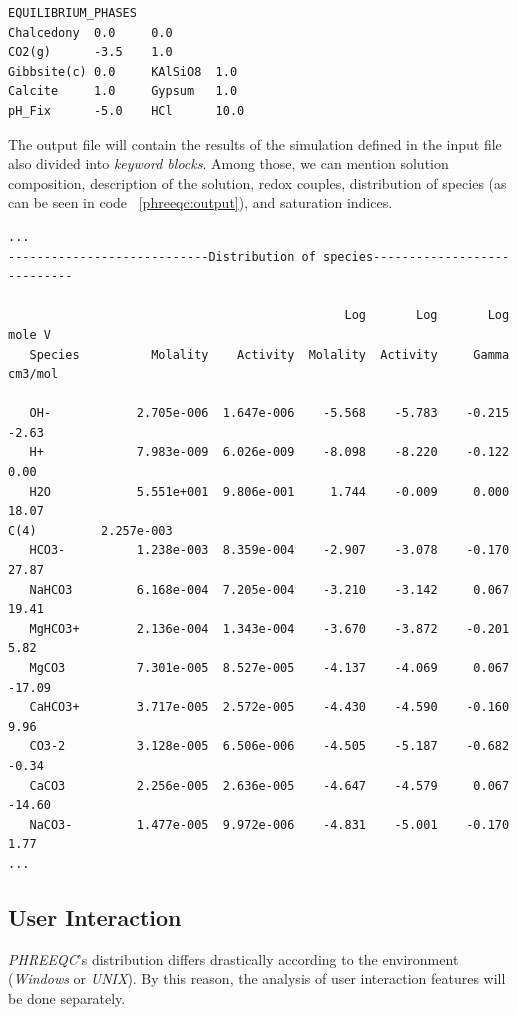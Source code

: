 \begin{minipage}[c]{0.92\textwidth}
\begin{lstlisting}[frame=single, caption=\emph{PHREEQC} keyword data block example, label=phreeqc:keyword]
EQUILIBRIUM_PHASES
Chalcedony  0.0     0.0
CO2(g)      -3.5    1.0
Gibbsite(c) 0.0     KAlSiO8  1.0
Calcite     1.0     Gypsum   1.0
pH_Fix      -5.0    HCl      10.0
\end{lstlisting}
\end{minipage}

The output file will contain the results of the simulation defined in the input file also divided into \emph{keyword blocks}. Among those, we can mention solution composition, description of the solution, redox couples, distribution of species (as can be seen in code ~\ref{phreeqc:output}), and saturation indices.

\begin{minipage}[c]{0.92\textwidth}
\begin{lstlisting}[frame=single, caption=\emph{PHREEQC}'s excerpt from the output file, label=phreeqc:output]
...
----------------------------Distribution of species----------------------------
 
                                               Log       Log       Log    mole V
   Species          Molality    Activity  Molality  Activity     Gamma   cm3/mol
 
   OH-            2.705e-006  1.647e-006    -5.568    -5.783    -0.215     -2.63
   H+             7.983e-009  6.026e-009    -8.098    -8.220    -0.122      0.00
   H2O            5.551e+001  9.806e-001     1.744    -0.009     0.000     18.07
C(4)         2.257e-003
   HCO3-          1.238e-003  8.359e-004    -2.907    -3.078    -0.170     27.87
   NaHCO3         6.168e-004  7.205e-004    -3.210    -3.142     0.067     19.41
   MgHCO3+        2.136e-004  1.343e-004    -3.670    -3.872    -0.201      5.82
   MgCO3          7.301e-005  8.527e-005    -4.137    -4.069     0.067    -17.09
   CaHCO3+        3.717e-005  2.572e-005    -4.430    -4.590    -0.160      9.96
   CO3-2          3.128e-005  6.506e-006    -4.505    -5.187    -0.682     -0.34
   CaCO3          2.256e-005  2.636e-005    -4.647    -4.579     0.067    -14.60
   NaCO3-         1.477e-005  9.972e-006    -4.831    -5.001    -0.170      1.77
...
\end{lstlisting}
\end{minipage}

\subsection{User Interaction}
\emph{PHREEQC}'s distribution differs drastically according to the environment (\emph{Windows} or \emph{UNIX}). By this reason, the analysis of user interaction features will be done separately.

